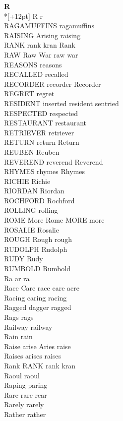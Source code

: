 \vspace{14pt}
\noindent\textbf{\Large R}\\*[+12pt]
R r\\
RAGAMUFFINS ragamuffins\\
RAISING Arising raising\\
RANK rank kran Rank\\
RAW Raw War raw war\\
REASONS reasons\\
RECALLED recalled\\
RECORDER recorder Recorder\\
REGRET regret\\
RESIDENT inserted resident sentried\\
RESPECTED respected\\
RESTAURANT restaurant\\
RETRIEVER retriever\\
RETURN return Return\\
REUBEN Reuben\\
REVEREND reverend Reverend\\
RHYMES rhymes Rhymes\\
RICHIE Richie\\
RIORDAN Riordan\\
ROCHFORD Rochford\\
ROLLING rolling\\
ROME More Rome MORE more\\
ROSALIE Rosalie\\
ROUGH Rough rough\\
RUDOLPH Rudolph\\
RUDY Rudy\\
RUMBOLD Rumbold\\
Ra ar ra\\
Race Care race care acre\\
Racing caring racing\\
Ragged dagger ragged\\
Rags rags\\
Railway railway\\
Rain rain\\
Raise arise Aries raise\\
Raises arises raises\\
Rank RANK rank kran\\
Raoul raoul\\
Raping paring\\
Rare rare rear\\
Rarely rarely\\
Rather rather\\
